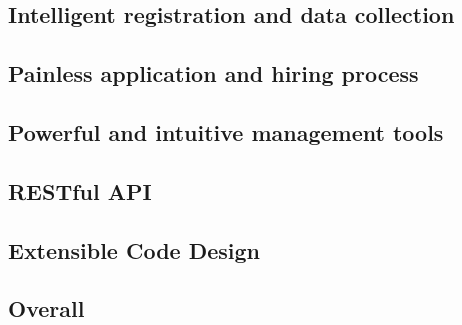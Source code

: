 
\subsection{Intelligent registration and data collection}

\lipsum[1]

\subsection{Painless application and hiring process}

\lipsum[2]

\subsection{Powerful and intuitive management tools}

\lipsum[3]

\subsection{RESTful API}

\lipsum[4]

\subsection{Extensible Code Design}

\lipsum[5]

\subsection{Overall}

\lipsum[6]
